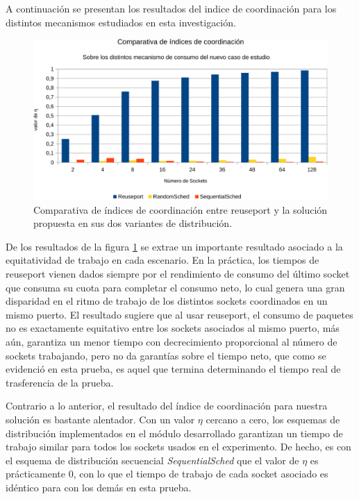 A continuación se presentan los resultados del indice de coordinación para los distintos mecanismos estudiados en esta investigación.

\begin{figure}[!h]
	\centering
	\includegraphics[scale=.6]{resultados/tiempodelta-crop.pdf}
	\caption{Comparativa de índices de coordinación entre reuseport y la solución propuesta en sus dos variantes de distribución.}
	\label{fig:tiemposdelta}
\end{figure}

De los resultados de la figura \ref{fig:tiemposdelta} se extrae un importante resultado asociado a la equitatividad de trabajo en cada escenario. En la práctica, los tiempos de reuseport vienen dados siempre por el rendimiento de consumo del último socket que consuma su cuota para completar el consumo neto, lo cual genera una gran disparidad en el ritmo de trabajo de los distintos sockets coordinados en un mismo puerto. El resultado sugiere que al usar reuseport, el consumo de paquetes no es exactamente equitativo entre los sockets asociados al mismo puerto, más aún, garantiza un menor tiempo con decrecimiento proporcional al número de sockets trabajando, pero no da garantías sobre el tiempo neto, que como se evidenció en esta prueba, es aquel que termina determinando el tiempo real de trasferencia de la prueba.

Contrario a lo anterior, el resultado del índice de coordinación para nuestra solución es bastante alentador. Con un valor $\eta$ cercano a cero, los esquemas de distribución implementados en el módulo desarrollado garantizan un tiempo de trabajo similar para todos los sockets usados en el experimento. De hecho, es con el esquema de distribución secuencial \emph{SequentialSched} que el valor de $\eta$ es prácticamente 0, con lo que el tiempo de trabajo de cada socket asociado es idéntico para con los demás en esta prueba.


